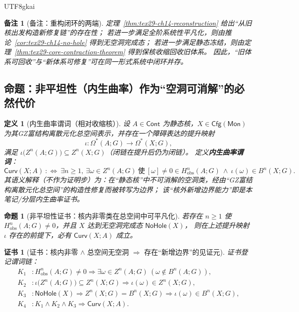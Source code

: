 \documentclass[12pt]{article}
\newtheorem{definition}{定义}[section]
\newtheorem{proposition}{命题}[section]
\newtheorem{remark}{备注}[section]
\newtheorem{Certificate}{证书}[section]
\newcommand{\KouJing}{\texorpdfstring{表述约定}{表述约定}}
\newcommand{\GZMonization}{\texorpdfstring{GZ富结构离散元化}{GZ富结构离散元化}}
\begin{document}
\begin{CJK*}{UTF8}{gkai}
\begin{remark}[备注：重构闭环的两端]
定理~\ref{thm:tex29-ch14-reconstruction} 给出“从旧核出发构造新修复链”的存在性；
若进一步满足全阶系统性平凡化，则由推论~\ref{cor:tex29-ch14-no-hole} 得到无空洞完成态；
若进一步满足静态冻结，则由定理~\ref{thm:tex29-core-contraction-theorem} 得到保核收缩回收旧体系。
因此，“旧体系可回收”与“新体系可修复”可在同一形式系统中闭环并存。
\end{remark}

\subsection{命题：非平坦性（内生曲率）作为“空洞可消解”的必然代价}
\label{subsec:tex29-ch14-curvature}

\begin{definition}[内生曲率谓词（相对收缩核）]
设 $A\in\mathsf{Cont}$ 为静态核，$X\in\mathsf{Cfg}(\mathsf{Mon})$ 为其\GZMonization{}总空间表示，并存在一个障碍表达的提升映射
\[
  \iota:\Omega^\ast(A;G)\longrightarrow \Omega^\ast(X;G),
\]
满足 $\iota\bigl(Z^n(A;G)\bigr)\subseteq Z^n(X;G)$（闭链在提升后仍为闭链）。
定义\textbf{内生曲率谓词}：
\[
  \mathsf{Curv}(X;A)\ :\Longleftrightarrow\ \exists n\ge 1,\ \exists \omega\in Z^n(A;G)\ \text{使}\ [\omega]\neq 0\in
    H^n_{\mathrm{obs}}(A;G)\ \wedge\ \iota(\omega)\in B^n(X;G).
\]
其语义解释（不作为证明步）为：在“静态核”中不可消解的空洞类，经由“\GZMonization{}总空间”的构造性修复而被转写为边界；
该“核外新增边界能力”即是本笔记/分层内生曲率证书。
\end{definition}

\begin{proposition}[非平坦性证书：核内非零类在总空间中可平凡化]
\label{prop:tex29-ch14-curvature}
若存在 $n\ge 1$ 使 $H^n_{\mathrm{obs}}(A;G)\neq 0$，并且 $X$ 达到无空洞完成态 $\mathsf{NoHole}(X)$，
则在上述提升映射 $\iota$ 存在的前提下，必有 $\mathsf{Curv}(X;A)$ 成立。
\end{proposition}

\begin{Certificate}[证书：核内非零 $\wedge$ 总空间无空洞 $\Rightarrow$ 存在“新增边界”的见证元]
\label{cert:tex29-ch14-curvature}
证书登记谓词链：
\[
\begin{aligned}
  K_1 &: H^n_{\mathrm{obs}}(A;G)\neq 0\Rightarrow \exists \omega\in Z^n(A;G)\ (\omega\notin B^n(A;G)),\\
  K_2 &: \iota\bigl(Z^n(A;G)\bigr)\subseteq Z^n(X;G)\Rightarrow \iota(\omega)\in Z^n(X;G),\\
  K_3 &: \mathsf{NoHole}(X)\Rightarrow Z^n(X;G)=B^n(X;G)\Rightarrow \iota(\omega)\in B^n(X;G),\\
  K_4 &: K_1\wedge K_2\wedge K_3\Rightarrow \mathsf{Curv}(X;A).
\end{aligned}
\]
\end{Certificate}


\end{CJK*}
\end{document}
